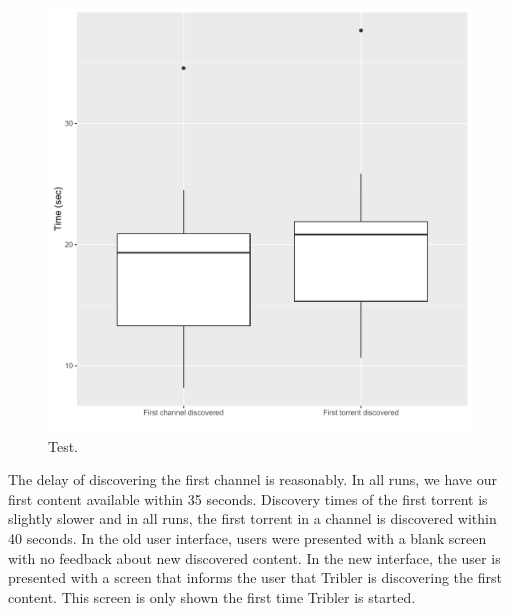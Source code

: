 \begin{figure}[!h]
	\centering
	\includegraphics[width=0.6\columnwidth]{images/experiments/content_discovery_speed}
	\caption{Test.}
	\label{fig:content_discovery_speed}
\end{figure}

The delay of discovering the first channel is reasonably. In all runs, we have our first content available within 35 seconds. Discovery times of the first torrent is slightly slower and in all runs, the first torrent in a channel is discovered within 40 seconds. In the old user interface, users were presented with a blank screen with no feedback about new discovered content. In the new interface, the user is presented with a screen that informs the user that Tribler is discovering the first content. This screen is only shown the first time Tribler is started.


